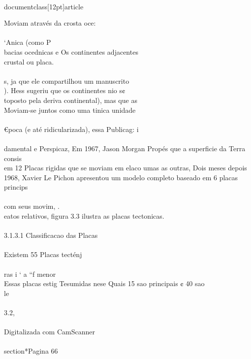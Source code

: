 \\documentclass[12pt]{article}
\begin{document}
Moviam através da crosta oce:\\
\\
‘Anica (como P\\
bacias ocednicas e Os continentes adjacentes\\
crustal ou placa.\\
\\
s, ja que ele compartilhou um manuscrito\\
). Hess sugeriu que os continentes nio s¢\\
toposto pela deriva continental), mas que as\\
Moviam-se juntos como uma tinica unidade\\
\\
€poca (e até ridicularizada), essa Publicag: i\\
\\
damental e Perspicaz, Em 1967, Jason Morgan Propés que a superficie da Terra consis\\
em 12 Placas rigidas que se moviam em elaco umas as outras, Dois meses depois\\
1968, Xavier Le Pichon apresentou um modelo completo baseado em 6 placas princips\\
\\
com seus movim, .\\
eatos relativos, figura 3.3 ilustra as placas tectonicas.\\
\\
3.1.3.1 Classificacao das Placas\\
\\
Existem 55 Placas tecténj\\
\\
ras i ‘ a “f menor\\
Essas placas estig Tesumidas nese Quais 15 sao principais ¢ 40 sao\\
le\\
\\
3.2,\\
\\
Digitalizada com CamScanner\\

\\section*{Pagina 66}
\end{document}
